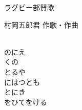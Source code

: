 \documentclass[10pt,b5j]{tarticle} %
\begin{document}
\begin{minipage}[c]{0.7\hsize} %
    \begin{center}
        {\LARGE
            ラグビー部賛歌 %
        }
        {\small 
        }
    \end{center}
\end{minipage}
\begin{minipage}[c]{0.3\hsize} %
    \begin{flushright} %
        村岡五郎君 作歌・作曲 %
    \end{flushright}
\end{minipage}

\vspace{1.5em} %
\newcommand{\linespace}{0.5em} %
\newcommand{\blocksize}{0.5\hsize} %
\newcommand{\itemmargin}{3em} %
\begin{enumerate} %
    \setlength{\itemindent}{\itemmargin} %
    \begin{minipage}[c]{\blocksize}
    
        \vspace{\linespace}
        \item~\\
        のにえ\\
        くの\\
        とるや\\
        にはつとも\\
        とにき\\
        をひてをける
    
    \end{minipage}
\end{enumerate} %
\end{document}
